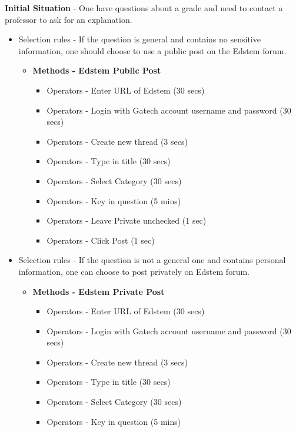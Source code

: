 \documentclass[
	letterpaper, %
]{jdf}
\begin{document}
\textbf{Initial Situation} - One have questions about a grade and need to contact a professor to ask for an explanation.
\begin{itemize}
    \item Selection rules - If the question is general and contains no sensitive information, one should choose to use a public post on the Edstem forum.
        \begin{itemize}
            \item \textbf{Methods - Edstem Public Post}
                \begin{itemize}
                    \item Operators - Enter URL of Edstem (30 secs)
                    \item Operators - Login with Gatech account username and password (30 secs)
                    \item Operators - Create new thread (3 secs)
                    \item Operators - Type in title (30 secs)
                    \item Operators - Select Category (30 secs)
                    \item Operators - Key in question (5 mins)
                    \item Operators - Leave Private unchecked (1 sec)
                    \item Operators - Click Post (1 sec)
                \end{itemize}
        \end{itemize}
    \item Selection rules - If the question is not a general one and contains personal information, one can choose to post privately on Edstem forum.
        \begin{itemize}
            \item \textbf{Methods - Edstem Private Post}
                \begin{itemize}
                    \item Operators - Enter URL of Edstem (30 secs)
                    \item Operators - Login with Gatech account username and password (30 secs)
                    \item Operators - Create new thread (3 secs)
                    \item Operators - Type in title (30 secs)
                    \item Operators - Select Category (30 secs)
                    \item Operators - Key in question (5 mins)

\end{itemize}
\end{itemize}
\end{itemize}
\end{document}
